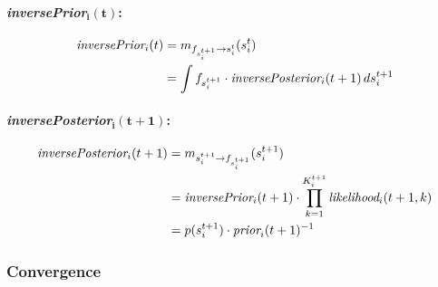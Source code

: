 \documentclass[article]{jss}
\newif\ifen
\newif\ifes
\newcommand{\en}[1]{\ifen#1\fi}
\newcommand{\es}[1]{\ifes#1\fi}
\newcommand{\vm}[1]{\mathbf{#1}}
\begin{document}
 \paragraph{\emph{inversePrior}$\bm{_i(t)}$: }

 \begin{equation}
 \begin{split}
 \emph{inversePrior}_i(t) &= m_{f_{s_i^{t+1}} \rightarrow s_i^t}(s_i^t) \\
 &= \int f_{s_i^{t+1}} \cdot \emph{inversePosterior}_i(t+1) \, ds_i^{t+1}
 \end{split}
 \end{equation}

  \paragraph{\emph{inversePosterior}$\bm{_i(t+1)}$: }

 \begin{equation}
 \begin{split}
 \emph{inversePosterior}_i(t+1) &= m_{s_i^{t+1} \rightarrow f_{s_i^{t+1}}}(s_i^{t+1}) \\
 &= \emph{inversePrior}_i(t+1) \cdot \prod_{k=1}^{K_i^{t+1}} \emph{likelihood}_i(t+1,k) \\
 &= p(s_i^{t+1}) \cdot \emph{prior}_i(t+1)^{-1}
 \end{split}
 \end{equation}

\subsubsection{Convergence}

\en{\paragraph{Temporal batch} Within a temporal batch $t$, we go through the games outcomes $\vm{y}^t$ several times until convergence.}
\es{\paragraph{Bache temporal} Dentro de un bache temporal $t$, pasamos por los resultados de los juegos $\vm{y}^t$, varias veces hasta su convergencia.}
\en{The update for a game outcome $y^t_i(k)$ is performed by the same way as original TrueSkill using as prior the \emph{withinPrior}$_i(t,k)$ and saving the \emph{likelihood}$_i(t,k)$.}
\es{La actualizaci\'on para un resultado de un juego $y^t_i(k)$, se realiza de la misma manera que TrueSkill original, usando como priori el \emph{withinPrior}$_i(t,k)$ y guardando el \emph{likelihood}$_i(t,k)$.}
\end{document}
